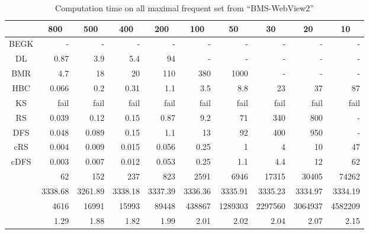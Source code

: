 \begin{table}
\caption{Computation time on all maximal frequent set from ``BMS-WebView2''}
\label{bms2}
\begin{center}
\begin{tabular}[c]{| r | r | r | r | r | r | r | r | r | r|}
\hline
\multicolumn{1}{|c||}{} & \multicolumn{1}{|c|}{800} & \multicolumn{1}{|c|}{500} & \multicolumn{1}{|c|}{400} & \multicolumn{1}{|c|}{200} & \multicolumn{1}{|c|}{100} & \multicolumn{1}{|c|}{50} & \multicolumn{1}{|c|}{30} & \multicolumn{1}{|c|}{20} & \multicolumn{1}{|c|}{10} \\\hline 
\multicolumn{1}{|c||}{BEGK} & - & - & - & - & - & - & - & - & - \\\hline
\multicolumn{1}{|c||}{DL} & 0.87 & 3.9 & 5.4 & 94 & - & - & - & - & - \\\hline
\multicolumn{1}{|c||}{BMR} & 4.7 & 18 & 20 & 110 & 380 & 1000 & - & - & - \\\hline
\multicolumn{1}{|c||}{HBC} & 0.066 & 0.2 & 0.31 & 1.1 & 3.5 & 8.8 & 23 & 37 & 87 \\\hline
\multicolumn{1}{|c||}{KS} & fail & fail & fail & fail & fail & fail & fail & fail & fail \\\hline
\multicolumn{1}{|c||}{RS} & 0.039 & 0.12 & 0.15 & 0.87 & 9.2 & 71 & 340 & 800 & -\\\hline
\multicolumn{1}{|c||}{DFS} & 0.048 & 0.089 & 0.15 & 1.1 & 13 & 92 & 400 & 950 & -\\\hline
\multicolumn{1}{|c||}{cRS} & 0.004 & 0.009 & 0.015 & 0.056 & 0.25 & 1 & 4 & 10 & 47\\\hline
\multicolumn{1}{|c||}{cDFS} & 0.003 & 0.007 & 0.012 & 0.053 & 0.25 & 1.1 & 4.4 & 12 & 62\\\hline
\hline
\multicolumn{1}{|c||}{} & 62 & 152 & 237 & 823 & 2591 & 6946 & 17315 & 30405 & 74262\\\hline
\multicolumn{1}{|c||}{} & 3338.68 & 3261.89 & 3338.18 & 3337.39 & 3336.36 & 3335.91 & 3335.23 & 3334.97 & 3334.19\\\hline
\multicolumn{1}{|c||}{} & 4616 & 16991 & 15993 & 89448 & 438867 & 1289303 & 2297560 & 3064937 & 4582209\\\hline
\multicolumn{1}{|c||}{} & 1.29 & 1.88 & 1.82 & 1.99 & 2.01 & 2.02 & 2.04 & 2.07 & 2.15 \\\hline
\end{tabular}
\end{center}
\end{table}

